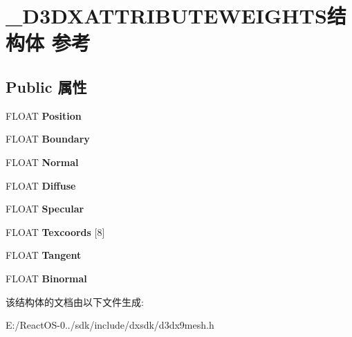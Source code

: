 \hypertarget{struct___d3_d_x_a_t_t_r_i_b_u_t_e_w_e_i_g_h_t_s}{}\section{\+\_\+\+D3\+D\+X\+A\+T\+T\+R\+I\+B\+U\+T\+E\+W\+E\+I\+G\+H\+T\+S结构体 参考}
\label{struct___d3_d_x_a_t_t_r_i_b_u_t_e_w_e_i_g_h_t_s}
\subsection*{Public 属性}
\begin{DoxyCompactItemize}
\item 
\mbox{\label{struct___d3_d_x_a_t_t_r_i_b_u_t_e_w_e_i_g_h_t_s_ae5688295c577cc176efdb387cf6ba8a2}} 
F\+L\+O\+AT {\bfseries Position}
\item 
\mbox{\label{struct___d3_d_x_a_t_t_r_i_b_u_t_e_w_e_i_g_h_t_s_aefa7c3ebf8a5aee50d01515c2e62f720}} 
F\+L\+O\+AT {\bfseries Boundary}
\item 
\mbox{\label{struct___d3_d_x_a_t_t_r_i_b_u_t_e_w_e_i_g_h_t_s_a68bf272468c53b99d294b9b8c52e489c}} 
F\+L\+O\+AT {\bfseries Normal}
\item 
\mbox{\label{struct___d3_d_x_a_t_t_r_i_b_u_t_e_w_e_i_g_h_t_s_a743e0a619ee245432efd042b841eb887}} 
F\+L\+O\+AT {\bfseries Diffuse}
\item 
\mbox{\label{struct___d3_d_x_a_t_t_r_i_b_u_t_e_w_e_i_g_h_t_s_abbbfd0b8d6ef27f935191043642ceda2}} 
F\+L\+O\+AT {\bfseries Specular}
\item 
\mbox{\label{struct___d3_d_x_a_t_t_r_i_b_u_t_e_w_e_i_g_h_t_s_a5501472dd14782e88695c5cfd59de78a}} 
F\+L\+O\+AT {\bfseries Texcoords} \mbox{[}8\mbox{]}
\item 
\mbox{\label{struct___d3_d_x_a_t_t_r_i_b_u_t_e_w_e_i_g_h_t_s_a29e53a00e3000fdf214b345886b4d122}} 
F\+L\+O\+AT {\bfseries Tangent}
\item 
\mbox{\label{struct___d3_d_x_a_t_t_r_i_b_u_t_e_w_e_i_g_h_t_s_a0689be87467f11890094c0ec0528eca1}} 
F\+L\+O\+AT {\bfseries Binormal}
\end{DoxyCompactItemize}


该结构体的文档由以下文件生成\+:\begin{DoxyCompactItemize}
\item 
E\+:/\+React\+O\+S-\/0../sdk/include/dxsdk/d3dx9mesh.\+h\end{DoxyCompactItemize}
